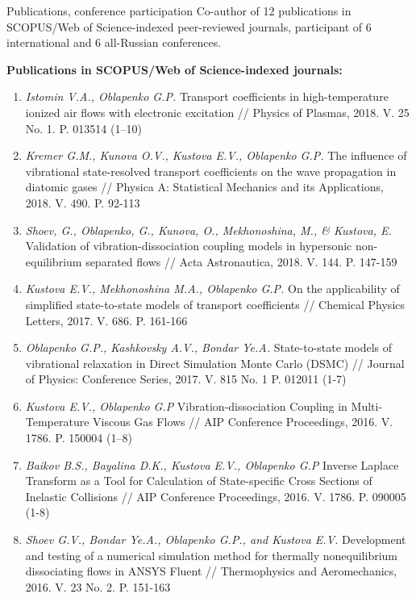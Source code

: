 \documentclass{resume} %
\begin{document}
\pagebreak

\begin{rSection}{Publications, conference participation}
Co-author of 12 publications in SCOPUS/Web of Science-indexed peer-reviewed journals, participant of 6 international and 6 all-Russian conferences.

{\bf Publications in SCOPUS/Web of Science-indexed journals:}

\begin{enumerate}
\item \emph{Istomin V.A., Oblapenko G.P.} Transport coefficients in high-temperature ionized air flows with electronic excitation // Physics of Plasmas, 2018. V. 25 No. 1. P. 013514 (1--10)

\item \emph{Kremer G.M., Kunova O.V., Kustova E.V., Oblapenko G.P.} The influence of vibrational state-resolved transport coefficients on the wave propagation in diatomic gases // Physica A: Statistical Mechanics and its Applications, 2018. V. 490. P. 92-113

\item \emph{Shoev, G., Oblapenko, G., Kunova, O., Mekhonoshina, M., \& Kustova, E.} Validation of vibration-dissociation coupling models in hypersonic non-equilibrium separated flows // Acta Astronautica, 2018. V. 144. P. 147-159

\item \emph{Kustova E.V., Mekhonoshina M.A., Oblapenko G.P.} On the applicability of simplified state-to-state models of transport coefficients // Chemical Physics Letters, 2017. V. 686. P. 161-166

\item \emph{Oblapenko G.P., Kashkovsky A.V., Bondar Ye.A.} State-to-state models of vibrational relaxation in Direct Simulation Monte Carlo (DSMC) // Journal of Physics: Conference Series, 2017. V. 815 No. 1 P. 012011 (1-7)

\item  \emph{Kustova E.V., Oblapenko G.P} Vibration-dissociation Coupling in Multi-Temperature Viscous Gas Flows // AIP Conference Proceedings, 2016. V. 1786. P. 150004 (1–8)

\item  \emph{Baikov B.S., Bayalina D.K., Kustova E.V., Oblapenko G.P} Inverse Laplace Transform as a Tool for Calculation of State-specific Cross Sections of Inelastic Collisions // AIP Conference Proceedings, 2016. V. 1786. P. 090005 (1-8)

\item  \emph{Shoev G.V., Bondar Ye.A., Oblapenko G.P., and Kustova E.V.} Development and testing of a numerical simulation method for thermally nonequilibrium dissociating flows in ANSYS Fluent // Thermophysics and Aeromechanics, 2016. V. 23 No. 2. P. 151-163


\end{enumerate}
\end{rSection}
\end{document}
